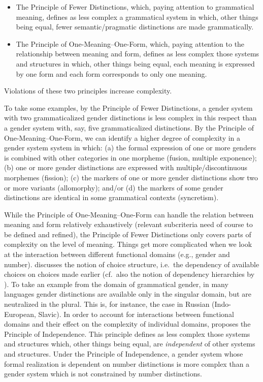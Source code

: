 \documentclass[output=collectionpaper]{langsci/langscibook}
\begin{document}
\begin{itemize}
\item The Principle of Fewer Distinctions, which, paying attention to grammatical meaning, defines as less complex a grammatical system in which, other things being equal, fewer semantic/pragmatic distinctions are made grammatically.
\item  The Principle of One-Meaning–One-Form, which, paying attention to the relationship between meaning and form, defines as less complex those systems and structures in which, other things being equal, each meaning is expressed by one form and each form corresponds to only one meaning.
\end{itemize}
Violations of these two principles increase complexity.

To take some examples, by the Principle of Fewer Distinctions, a gender system with two grammaticalized gender distinctions is less complex in this respect than a gender system with, say, five grammaticalized distinctions. By the Principle of One-Meaning–One-Form, we can identify a higher degree of complexity in a gender system system in which: (a) the formal expression of one or more genders is combined with other categories in one morpheme (fusion, multiple exponence); (b) one or more gender distinctions are expressed with multiple/discontinuous morphemes (fission); (c) the markers of one or more gender distinctions show two or more variants (allomorphy); and/or (d) the markers of some gender distinctions are identical in some grammatical contexts (syncretism).

While the Principle of One-Meaning–One-Form can handle the relation between meaning and form relatively exhaustively (relevant subcriteria need of course to be defined and refined), the Principle of Fewer Distinctions only covers parts of complexity on the level of meaning. Things get more complicated when we look at the interaction between different functional domains (e.g., gender and number). \citet{Dahl2004} discusses the notion of choice structure, i.e.\ the dependency of available choices on choices made earlier (cf.\ also the notion of dependency hierarchies by \citealt{Aikhenvald1998}). To take an example from the domain of grammatical gender, in many languages gender distinctions are available only in the singular domain, but are neutralized in the plural. This is, for instance, the case in Russian (Indo-European, Slavic). In order to account for interactions between functional domains and their effect on the complexity of individual domains, \citet{DiGarbo2014,DiGarbo2016} proposes the Principle of Independence. This principle defines as less complex those systems and structures which, other things being equal, are \textit{independent} of other systems and structures.  Under the Principle of Independence, a gender system whose formal realization is dependent on number distinctions is more complex than a gender system which is not constrained by number distinctions.
\end{document}
